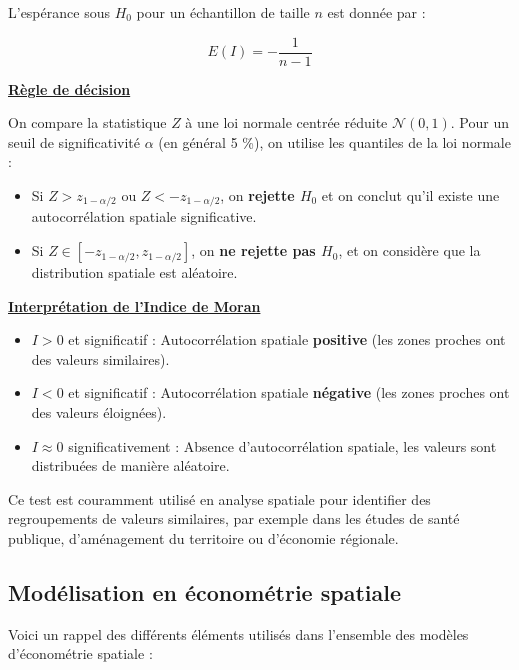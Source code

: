\documentclass[
]{article}
\begin{document}
L'espérance sous \(H_0\) pour un échantillon de taille \(n\) est donnée
par :

\[
    E(I) = -\frac{1}{n - 1}
\]

\underline{\textbf{Règle de décision}}

On compare la statistique \(Z\) à une loi normale centrée réduite
\(\mathcal{N}(0,1)\). Pour un seuil de significativité \(\alpha\) (en
général 5 \%), on utilise les quantiles de la loi normale :

\begin{itemize}
    \item Si \( Z > z_{1-\alpha/2} \) ou \( Z < -z_{1-\alpha/2} \), on \textbf{rejette \( H_0 \)} et on conclut qu’il existe une autocorrélation spatiale significative.
    \item Si \( Z \in [-z_{1-\alpha/2}, z_{1-\alpha/2}] \), on \textbf{ne rejette pas \( H_0 \)}, et on considère que la distribution spatiale est aléatoire.
\end{itemize}

\underline{\textbf{Interprétation de l’Indice de Moran}}

\begin{itemize}
    \item \( I > 0 \) et significatif : Autocorrélation spatiale \textbf{positive} (les zones proches ont des valeurs similaires).
    \item \( I < 0 \) et significatif : Autocorrélation spatiale \textbf{négative} (les zones proches ont des valeurs éloignées).
    \item \( I \approx 0 \) significativement : Absence d’autocorrélation spatiale, les valeurs sont distribuées de manière aléatoire.
\end{itemize}

Ce test est couramment utilisé en analyse spatiale pour identifier des
regroupements de valeurs similaires, par exemple dans les études de
santé publique, d'aménagement du territoire ou d'économie régionale.

\subsection{Modélisation en économétrie
spatiale}\label{moduxe9lisation-en-uxe9conomuxe9trie-spatiale}

Voici un rappel des différents éléments utilisés dans l'ensemble des
modèles d'économétrie spatiale :
\end{document}
